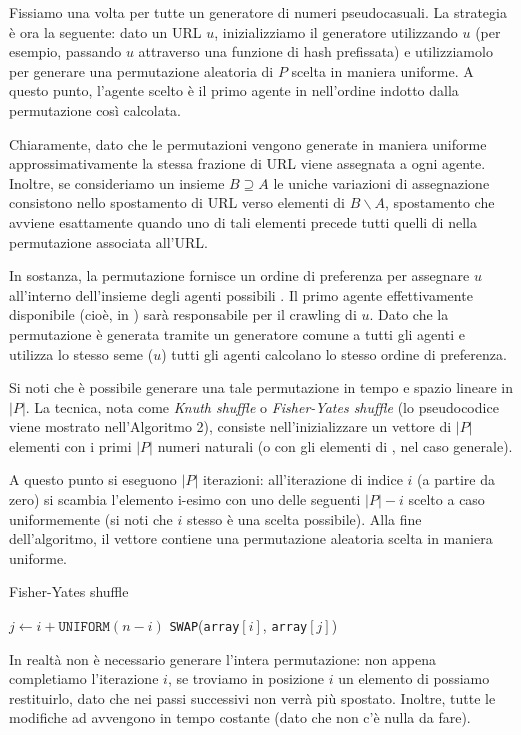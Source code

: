 Fissiamo una volta per tutte un generatore di numeri pseudocasuali. La strategia è ora la seguente: dato un URL $u$, inizializziamo il generatore utilizzando $u$ (per esempio, passando $u$ attraverso una funzione di hash prefissata) e utilizziamolo per generare una permutazione aleatoria di $P$ scelta in maniera uniforme. A questo punto, l'agente scelto è il primo agente in  nell'ordine indotto dalla permutazione così calcolata.

Chiaramente, dato che le permutazioni vengono generate in maniera uniforme approssimativamente la stessa frazione di URL viene assegnata a ogni agente. Inoltre, se consideriamo un insieme $B \supseteq A$ le uniche variazioni di assegnazione consistono nello spostamento di URL verso elementi di $B \smallsetminus A$, spostamento che avviene esattamente quando uno di tali elementi precede tutti quelli di  nella permutazione associata all'URL.

In sostanza, la permutazione fornisce un ordine di preferenza per assegnare $u$ all'interno dell'insieme degli agenti possibili . Il primo agente effettivamente disponibile (cioè, in ) sarà responsabile per il crawling di $u$. Dato che la permutazione è generata tramite un generatore comune a tutti gli agenti e utilizza lo stesso seme ($u$) tutti gli agenti calcolano lo stesso ordine di preferenza.

Si noti che è possibile generare una tale permutazione in tempo e spazio lineare in $|P|$. La tecnica, nota come \textit{Knuth shuffle} o \textit{Fisher-Yates shuffle} (lo pseudocodice viene mostrato nell'Algoritmo 2), consiste nell'inizializzare un vettore di $|P|$ elementi con i primi $|P|$ numeri naturali (o con gli elementi di , nel caso generale).

A questo punto si eseguono $|P|$ iterazioni: all'iterazione di indice $i$ (a partire da zero) si scambia l'elemento i-esimo con uno delle seguenti $|P| - i$ scelto a caso uniformemente (si noti che $i$ stesso è una scelta possibile). Alla fine dell'algoritmo, il vettore contiene una permutazione aleatoria scelta in maniera uniforme.
\begin{algorithm}
	\caption{Fisher-Yates shuffle}
	\begin{algorithmic}
		\State $j \gets i + \texttt{UNIFORM}(n - i)$
		\State \texttt{SWAP}(\texttt{array}$[i]$, \texttt{array}$[j]$)
		\EndFor
	\end{algorithmic}
\end{algorithm}
In realtà non è necessario generare l'intera permutazione: non appena completiamo l'iterazione $i$, se troviamo in posizione $i$ un elemento di  possiamo restituirlo, dato che nei passi successivi non verrà più spostato. Inoltre, tutte le modifiche ad  avvengono in tempo costante (dato che non c'è nulla da fare).
